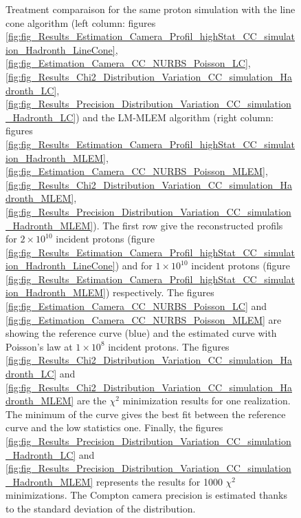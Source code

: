\begin{figure} [!h]
\caption{Treatment comparaison for the same proton simulation with the line cone algorithm (left column: figures \ref{fig:fig_Results_Estimation_Camera_Profil_highStat_CC_simulation_Hadronth_LineCone}, \ref{fig:fig_Estimation_Camera_CC_NURBS_Poisson_LC}, \ref{fig:fig_Results_Chi2_Distribution_Variation_CC_simulation_Hadronth_LC}, \ref{fig:fig_Results_Precision_Distribution_Variation_CC_simulation_Hadronth_LC}) and the LM-MLEM algorithm (right column: figures \ref{fig:fig_Results_Estimation_Camera_Profil_highStat_CC_simulation_Hadronth_MLEM}, \ref{fig:fig_Estimation_Camera_CC_NURBS_Poisson_MLEM}, \ref{fig:fig_Results_Chi2_Distribution_Variation_CC_simulation_Hadronth_MLEM}, \ref{fig:fig_Results_Precision_Distribution_Variation_CC_simulation_Hadronth_MLEM}). The first row give the reconstructed profils for $2\times10^{10}$ incident protons (figure \ref{fig:fig_Results_Estimation_Camera_Profil_highStat_CC_simulation_Hadronth_LineCone}) and for $1\times10^{10}$ incident protons (figure \ref{fig:fig_Results_Estimation_Camera_Profil_highStat_CC_simulation_Hadronth_MLEM}) respectively. The figures \ref{fig:fig_Estimation_Camera_CC_NURBS_Poisson_LC} and \ref{fig:fig_Estimation_Camera_CC_NURBS_Poisson_MLEM} are showing the reference curve (blue) and the estimated curve with Poisson's law at $1\times10^8$ incident protons. The figures \ref{fig:fig_Results_Chi2_Distribution_Variation_CC_simulation_Hadronth_LC} and \ref{fig:fig_Results_Chi2_Distribution_Variation_CC_simulation_Hadronth_MLEM} are the $\chi^2$ minimization results for one realization. The minimum of the curve gives the best fit between the reference curve and the low statistics one. Finally, the figures  \ref{fig:fig_Results_Precision_Distribution_Variation_CC_simulation_Hadronth_LC} and \ref{fig:fig_Results_Precision_Distribution_Variation_CC_simulation_Hadronth_MLEM} represents the results for 1000 $\chi^2$ minimizations. The Compton camera precision is estimated thanks to the standard deviation of the distribution. }
\end{figure}


